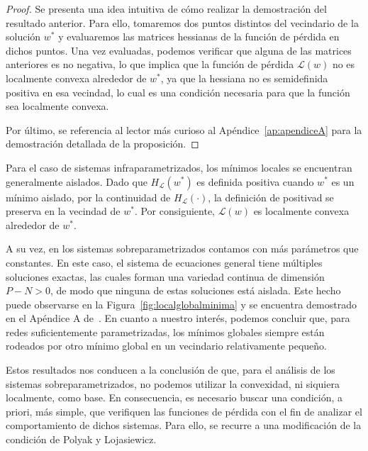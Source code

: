 \begin{proof}
    Se presenta una idea intuitiva de cómo realizar la demostración del resultado anterior. Para ello, tomaremos dos puntos distintos del vecindario de la solución $w^*$ y evaluaremos las matrices hessianas de la función de pérdida en dichos puntos. Una vez evaluadas, podemos verificar que alguna de las matrices anteriores es no negativa, lo que implica que la función de pérdida $\mathcal{L}(w)$ no es localmente convexa alrededor de $w^*$, ya que la hessiana no es semidefinida positiva en esa vecindad, lo cual es una condición necesaria para que la función sea localmente convexa.\newline

    Por último, se referencia al lector más curioso al Apéndice~\ref{ap:apendiceA} para la demostración detallada de la proposición.\newline
\end{proof}

Para el caso de sistemas infraparametrizados, los mínimos locales se encuentran generalmente aislados. Dado que $H_{\mathcal{L}}(w^{*})$ es definida positiva cuando $w^{*}$ es un mínimo aislado, por la continuidad de $H_{\mathcal{L}}(\cdot)$, la definición de positivad se preserva en la vecindad de $w^{*}$. Por consiguiente, $\mathcal{L}(w)$ es localmente convexa alrededor de $w^{*}$.\newline

A su vez, en los sistemas sobreparametrizados contamos con más parámetros que constantes. En este caso, el sistema de ecuaciones general tiene múltiples soluciones exactas, las cuales forman una variedad continua de dimensión $P - N > 0$, de modo que ninguna de estas soluciones está aislada. Este hecho puede observarse en la Figura~\ref{fig:localglobalminima} y se encuentra demostrado en el Apéndice A de~\cite{Liu2021}. En cuanto a nuestro interés, podemos concluir que, para redes suficientemente parametrizadas, los mínimos globales siempre están rodeados por otro mínimo global en un vecindario relativamente pequeño.\newline

Estos resultados nos conducen a la conclusión de que, para el análisis de los sistemas sobreparametrizados, no podemos utilizar la convexidad, ni siquiera localmente, como base. En consecuencia, es necesario buscar una condición, a priori, más simple, que verifiquen las funciones de pérdida con el fin de analizar el comportamiento de dichos sistemas. Para ello, se recurre a una modificación de la condición de Polyak y Lojasiewicz.\newline

